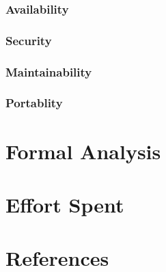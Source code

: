 \documentclass[12pt,a4paper]{report}
\begin{document}
		\subsection{Availability}
		\subsection{Security}
		\subsection{Maintainability}
		\subsection{Portablity}

\chapter{Formal Analysis}

\chapter{Effort Spent}

\chapter{References}
\end{document}
